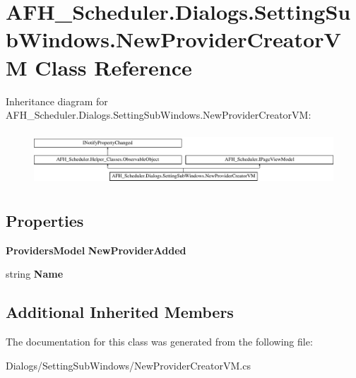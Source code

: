 \section{A\+F\+H\+\_\+\+Scheduler.\+Dialogs.\+Setting\+Sub\+Windows.\+New\+Provider\+Creator\+VM Class Reference}
\label{class_a_f_h___scheduler_1_1_dialogs_1_1_setting_sub_windows_1_1_new_provider_creator_v_m}
Inheritance diagram for A\+F\+H\+\_\+\+Scheduler.\+Dialogs.\+Setting\+Sub\+Windows.\+New\+Provider\+Creator\+VM\+:\begin{figure}[H]
\begin{center}
\leavevmode
\includegraphics[height=2.038835cm]{class_a_f_h___scheduler_1_1_dialogs_1_1_setting_sub_windows_1_1_new_provider_creator_v_m}
\end{center}
\end{figure}
\subsection*{Properties}
\begin{DoxyCompactItemize}
\item 
\mbox{\label{class_a_f_h___scheduler_1_1_dialogs_1_1_setting_sub_windows_1_1_new_provider_creator_v_m_a4ae066f29d2a315d08840a0fae913f61}} 
\textbf{ Providers\+Model} {\bfseries New\+Provider\+Added}\hspace{0.3cm}{\ttfamily  [get, set]}
\item 
\mbox{\label{class_a_f_h___scheduler_1_1_dialogs_1_1_setting_sub_windows_1_1_new_provider_creator_v_m_aee09da6d9c6dde30aa25f43109759228}} 
string {\bfseries Name}\hspace{0.3cm}{\ttfamily  [get]}
\end{DoxyCompactItemize}
\subsection*{Additional Inherited Members}


The documentation for this class was generated from the following file\+:\begin{DoxyCompactItemize}
\item 
Dialogs/\+Setting\+Sub\+Windows/New\+Provider\+Creator\+V\+M.\+cs\end{DoxyCompactItemize}
